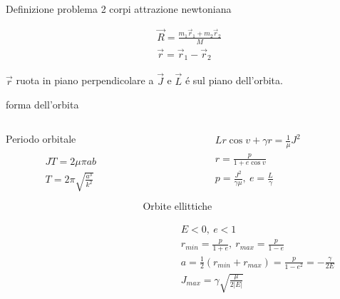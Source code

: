 \begin{wordonframe}{Definizione problema 2 corpi attrazione newtoniana}

\begin{align*}
&\vec{R}=\frac{m_1\vec{r}_1+m_2\vec{r}_2}{M}\\
&\vec{r}=\vec{r}_1-\vec{r}_2
\end{align*}

$\vec{r}$ ruota in piano perpendicolare a $\vec{J}$ e $\vec{L}$ \'e sul piano dell'orbita.

\end{wordonframe}


\begin{frame}{forma dell'orbita}

\begin{columns}

\begin{column}{0.4\textwidth}



\begin{block}{Periodo orbitale}

\begin{align*}
&JT=2\mu\pi ab\\
&T=2\pi\sqrt{\frac{a^3}{k^2}}
\end{align*}

\end{block}

\end{column}

\begin{column}{0.45\textwidth}

\begin{align*}
&Lr\cos{v}+\gamma r=\frac{1}{\mu}J^2\\
&r=\frac{p}{1+e\cos{v}}\\
&p=\frac{J^2}{\gamma\mu},\ e=\frac{L}{\gamma}
\end{align*}

\begin{block}{Orbite ellittiche}

\begin{align*}
&E<0,\ e<1\\
&r_{min}=\frac{p}{1+e},\ r_{max}=\frac{p}{1-e}\\
&a=\frac{1}{2}(r_{min}+r_{max})=\frac{p}{1-e^2}=-\frac{\gamma}{2E}\\
&J_{max}=\gamma\sqrt{\frac{\mu}{2|E|}}
\end{align*}

\end{block}

\end{column}

\end{columns}

\end{frame}

